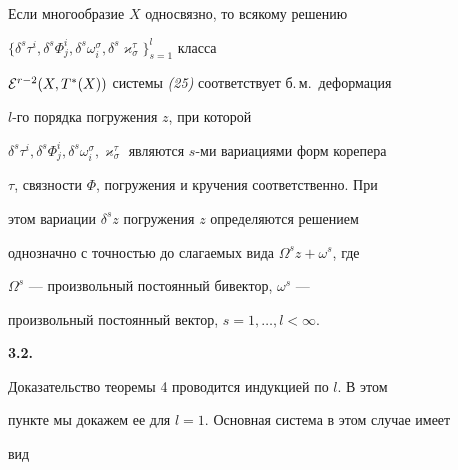 \begin{thm}


Если многообразие $X$ односвязно, то всякому решению


$\{\delta^s\tau^i,\delta^s\Phi^i_j,\delta^s\omega^{\sigma}_i,


\delta^s\varkappa^{\tau}_{\sigma}\}_{s=1}^l$ класса


${\cal E}^{r-2}(X,T^*(X))$ системы {\em (25)} соответствует б.\,м.~деформация


$l$-го порядка погружения $z$, при которой


$\delta^s\tau^i,\delta^s\Phi^i_j,\delta^s\omega^{\sigma}_i,


\varkappa^{\tau}_{\sigma}$ являются $s$-ми вариациями форм корепера


$\tau$, связности $\Phi$, погружения и кручения соответственно. При


этом вариации $\delta^sz$ погружения $z$ определяются решением


однозначно с точностью до слагаемых вида $\Omega^sz+\omega^s$, где


$\Omega^s$ --- произвольный постоянный бивектор, $\omega^s$ ---


произвольный постоянный вектор, $s=1,\dotsc,l<\infty$.


\end{thm}





{\bf 3.2.}


Доказательство теоремы 4 проводится индукцией по $l$. В этом


пункте мы докажем ее для $l=1$. Основная система в этом случае имеет


вид


